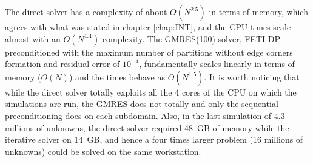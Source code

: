 The direct solver has a complexity of about $O(N^{2.5})$ in terms of memory, which agrees with what was stated in chapter \ref{chap:INT}, and the CPU times scale almost with an $O(N^{1.4})$ complexity. The GMRES(100) solver, FETI-DP preconditioned with the maximum number of partitions without edge corners formation and residual error of $10^{-4}$, fundamentally scales linearly in terms of memory ($O(N)$) and the times behave as $O(N^{1.5})$. It is worth noticing that while the direct solver totally exploits all the 4 cores of the CPU on which the simulations are run, the GMRES does not totally and only the sequential preconditioning does on each subdomain. Also, in the last simulation of 4.3 millions of unknowns, the direct solver required 48~GB of memory while the iterative solver on 14~GB, and hence a four times larger problem (16 millions of unknowns) could be solved on the same workstation.

%
%
%
%
%
%
